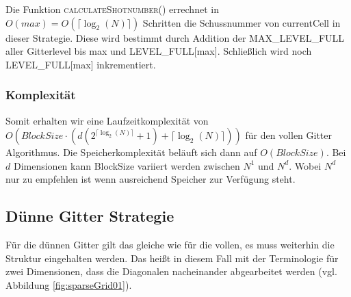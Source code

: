 \documentclass[a4paper,12pt]{llncs}
\numberwithin{equation}{section}
\begin{document}
Die Funktion \textsc{calculateShotnumber}() errechnet in $O(max) = O\left(\lceil\log_2(N)\rceil\right)$ Schritten die Schussnummer von currentCell in dieser Strategie. Diese wird bestimmt durch Addition der MAX\_LEVEL\_FULL aller Gitterlevel bis max und LEVEL\_FULL[max]. Schließlich wird noch LEVEL\_FULL[max] inkrementiert.

\subsubsection{Komplexität}
Somit erhalten wir eine Laufzeitkomplexität von \\ $O\left(BlockSize\cdot\left(d\left( 2^{\lceil\log_2(N)\rceil}+1\right)+\lceil\log_2(N)\rceil\right)\right)$ für den vollen Gitter Algorithmus. Die Speicherkomplexität beläuft sich dann auf $O(BlockSize)$. Bei $d$ Dimensionen kann BlockSize variiert werden zwischen $N^1$ und $N^d$. Wobei $N^d$ nur zu empfehlen ist wenn ausreichend Speicher zur Verfügung steht. 

\newpage
\subsection{Dünne Gitter Strategie}

Für die dünnen Gitter gilt das gleiche wie für die vollen, es muss weiterhin die Struktur eingehalten werden. Das heißt in diesem Fall mit der Terminologie für zwei Dimensionen, dass die Diagonalen nacheinander abgearbeitet werden (vgl. Abbildung \ref{fig:sparseGrid01}).
\end{document}
